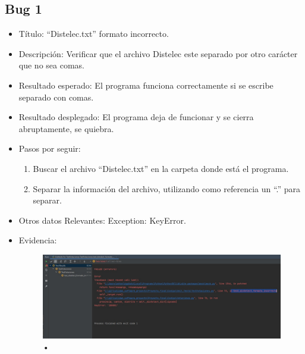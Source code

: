 \documentclass[conference]{IEEEtran}
\begin{document}
\subsection*{Bug 1}
\begin{itemize}

\item Título: “Distelec.txt” formato incorrecto.

\item Descripción: Verificar que el archivo Distelec este separado por otro carácter que no sea comas.

\item Resultado esperado: El programa funciona correctamente si se escribe separado con comas.

\item Resultado desplegado: El programa deja de funcionar y se cierra abruptamente, se quiebra. 

\item Pasos por seguir: 
\begin{enumerate}
\item Buscar el archivo “Distelec.txt” en la carpeta donde está el programa.
\item Separar la información del archivo, utilizando como referencia un “.” para separar.
\end{enumerate}

\item Otros datos Relevantes: Exception: KeyError.
\item Evidencia:
\begin{figure}[H]
\centering
\includegraphics[scale=0.2]{imagenes/distelect_formato_incorrecto.jpeg}
\caption{•}
\end{figure}

\end{itemize}
\end{document}
